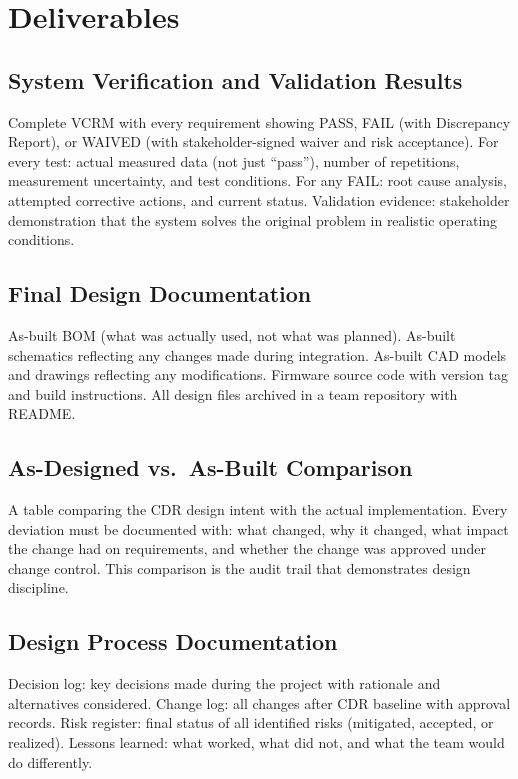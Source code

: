 \section{Deliverables}

\subsection{System Verification and Validation Results}
Complete VCRM with every requirement showing PASS, FAIL (with Discrepancy Report), or WAIVED (with stakeholder-signed waiver and risk acceptance). For every test: actual measured data (not just ``pass''), number of repetitions, measurement uncertainty, and test conditions. For any FAIL: root cause analysis, attempted corrective actions, and current status. Validation evidence: stakeholder demonstration that the system solves the original problem in realistic operating conditions.

\subsection{Final Design Documentation}
As-built BOM (what was actually used, not what was planned). As-built schematics reflecting any changes made during integration. As-built CAD models and drawings reflecting any modifications. Firmware source code with version tag and build instructions. All design files archived in a team repository with README.

\subsection{As-Designed vs.\ As-Built Comparison}
A table comparing the CDR design intent with the actual implementation. Every deviation must be documented with: what changed, why it changed, what impact the change had on requirements, and whether the change was approved under change control. This comparison is the audit trail that demonstrates design discipline.

\subsection{Design Process Documentation}
Decision log: key decisions made during the project with rationale and alternatives considered. Change log: all changes after CDR baseline with approval records. Risk register: final status of all identified risks (mitigated, accepted, or realized). Lessons learned: what worked, what did not, and what the team would do differently.

